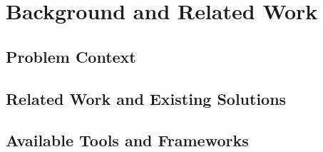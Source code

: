 \chapter{Background and Related Work}
\section{Problem Context}
\section{Related Work and Existing Solutions}
\section{Available Tools and Frameworks}
